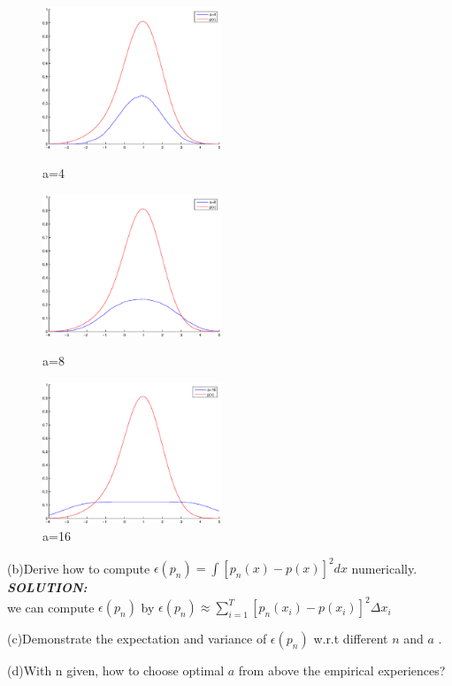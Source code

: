 \documentclass{article}
\theoremstyle{definition}
\theoremstyle{definition}
\theoremstyle{remark}
\begin{document}
\begin{figure}[!htbp]
\begin{minipage}[t]{0.3\linewidth}
\centering
\includegraphics[width=2.1in]{4.eps}
\caption{a=4}
\end{minipage}%
\begin{minipage}[t]{0.3\linewidth}
\centering
\includegraphics[width=2.1in]{8.eps}
\caption{a=8}
\end{minipage}
\begin{minipage}[t]{0.3\linewidth}
\centering
\includegraphics[width=2.1in]{16.eps}
\caption{a=16}
\end{minipage}
\end{figure}
(b)Derive how to compute $\epsilon(p_n)=\int[p_n(x)-p(x)]^2dx$ numerically.\\
\emph{\textbf{SOLUTION:}}\\
we can compute $\epsilon(p_n)$ by $\epsilon(p_n)\approx \sum_{i=1}^{T}[p_n(x_i)-p(x_i)]^2\Delta x_i$

(c)Demonstrate the expectation and variance of $\epsilon(p_n)$ w.r.t different $n$ and $a$ .

(d)With n given, how to choose optimal $a$ from above the empirical experiences?
\end{document}
